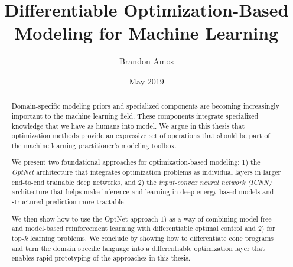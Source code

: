 \documentclass[12pt]{cmuthesis}
\begin{document}
\frontmatter

\pagestyle{empty}

\title{{\bf Differentiable Optimization-Based Modeling for Machine Learning}}
\author{Brandon Amos}
\date{May 2019}


\support{
}
\disclaimer{}


\maketitle


\begin{abstract}
  Domain-specific modeling priors and specialized components are
  becoming increasingly important to the machine learning field.
  These components integrate specialized knowledge that we have
  as humans into model.
  We argue in this thesis that optimization methods provide an
  expressive set of operations that should be part of the
  machine learning practitioner's modeling toolbox.

  We present two foundational approaches for optimization-based modeling:
  1) the \emph{OptNet} architecture that integrates
  optimization problems as individual layers in larger end-to-end
  trainable deep networks, and
  2) the \emph{input-convex neural network (ICNN)}
  architecture that helps make inference and learning in deep
  energy-based models and structured prediction more tractable.

  We then show how to use the OptNet approach
  1) as a way of combining model-free and model-based reinforcement
  learning with differentiable optimal control and
  2) for top-$k$ learning problems.
  We conclude by showing how to differentiate cone programs
  and turn the \cvxpy domain specific language into
  a differentiable optimization layer that enables rapid prototyping of
  the approaches in this thesis.
\end{abstract}
\end{document}
